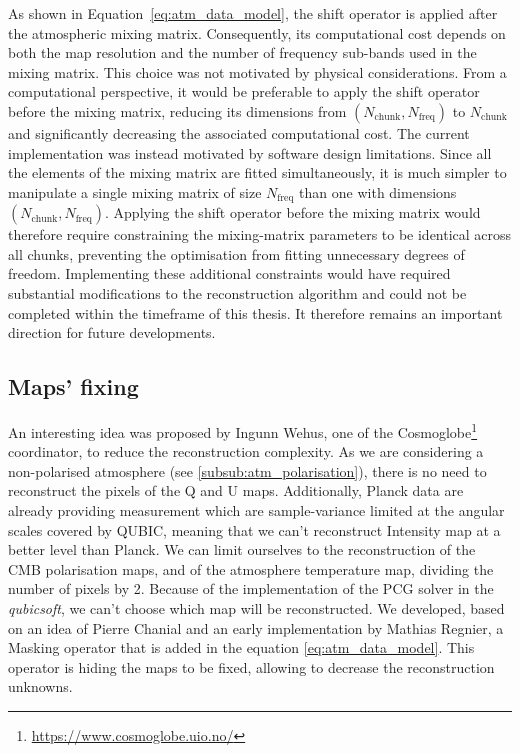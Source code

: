 \documentclass[../../thesis.tex]{subfiles}
\begin{document}
As shown in Equation~\ref{eq:atm_data_model}, the shift operator is applied after the atmospheric mixing matrix. Consequently, its computational cost depends on both the map resolution and the number of frequency sub-bands used in the mixing matrix. This choice was not motivated by physical considerations. From a computational perspective, it would be preferable to apply the shift operator before the mixing matrix, reducing its dimensions from $\left(N_\text{chunk}, N_\text{freq}\right)$ to $N_\text{chunk}$ and significantly decreasing the associated computational cost.
The current implementation was instead motivated by software design limitations. Since all the elements of the mixing matrix are fitted simultaneously, it is much simpler to manipulate a single mixing matrix of size $N_\text{freq}$ than one with dimensions $\left(N_\text{chunk}, N_\text{freq}\right)$. Applying the shift operator before the mixing matrix would therefore require constraining the mixing-matrix parameters to be identical across all chunks, preventing the optimisation from fitting unnecessary degrees of freedom. Implementing these additional constraints would have required substantial modifications to the reconstruction algorithm and could not be completed within the timeframe of this thesis. It therefore remains an important direction for future developments.

\subsection{Maps' fixing} \label{sub:atm_maps_fixing}

An interesting idea was proposed by Ingunn Wehus, one of the Cosmoglobe\footnote{\url{https://www.cosmoglobe.uio.no/}} coordinator, to reduce the reconstruction complexity. As we are considering a non-polarised atmosphere (see \ref{subsub:atm_polarisation}), there is no need to reconstruct the pixels of the Q and U maps. Additionally, Planck data are already providing measurement which are sample-variance limited at the angular scales covered by QUBIC, meaning that we can't reconstruct Intensity map at a better level than Planck. We can limit ourselves to the reconstruction of the CMB polarisation maps, and of the atmosphere temperature map, dividing the number of pixels by 2. 
Because of the implementation of the PCG solver in the \emph{qubicsoft}, we can't choose which map will be reconstructed. We developed, based on an idea of Pierre Chanial and an early implementation by Mathias Regnier, a Masking operator that is added in the equation \ref{eq:atm_data_model}. This operator is hiding the maps to be fixed, allowing to decrease the reconstruction unknowns. 
\end{document}
